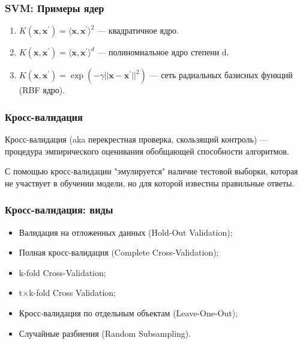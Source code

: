 \documentclass[11pt]{beamer}
\begin{document}
	\begin{frame}
		\frametitle{SVM: Примеры ядер}
		\begin{enumerate}
			\item $K(\bm{x}, \bm{x}^{'}) = \langle\bm{x}, \bm{x}^{'} \rangle^2$ --- квадратичное ядро. 
			\item $K(\bm{x}, \bm{x}^{'}) = \langle \bm{x}, \bm{x}^{'} \rangle^d$ --- полиномиальное ядро степени d. 
			\item $K(\bm{x}, \bm{x}^{'}) = \exp(-\gamma ||\bm{x} -  \bm{x}^{'}||^2) $ --- сеть радиальных базисных функций (RBF ядро).
		\end{enumerate}
	\end{frame}

	\begin{frame}
		\frametitle{Кросс-валидация}
		Кросс-валидация (aka перекрестная проверка, скользящий контроль) --- процедура эмпирического оценивания обобщающей способности алгоритмов. 
		
		С помощью кросс-валидации "эмулируется" наличие тестовой выборки, которая не участвует в обучении модели, но для которой известны правильные ответы.
		
	\end{frame}
	\begin{frame}
		\frametitle{Кросс-валидация: виды}
		\begin{itemize}
			\item Валидация на отложенных данных (Hold-Out Validation);
			\item Полная кросс-валидация (Complete Cross-Validation);
			\item k-fold Cross-Validation;
			\item t$\times$k-fold Cross Validation;
			\item Кросс-валидация по отдельным объектам (Leave-One-Out);
			\item Случайные разбиения (Random Subsampling).
		\end{itemize}
		
	\end{frame}
\end{document}
